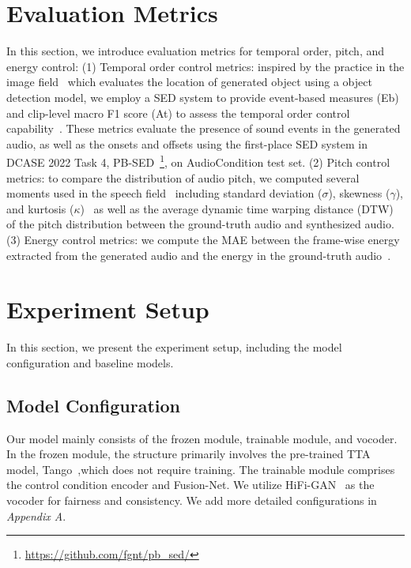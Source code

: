 \documentclass[letterpaper]{article} %
\begin{document}
\section{Evaluation Metrics} 

In this section, we introduce evaluation metrics for temporal order, pitch, and energy control: (1) Temporal order control metrics: inspired by the practice in the image field~\cite{li2023gligen,jahn2021highresolutioncs} which evaluates the location of generated object using a object detection model, we employ a SED system to provide event-based measures (Eb) and clip-level macro F1 score (At) to assess the temporal order control capability~\cite{mesaros2016eventf1}. These metrics evaluate the presence of sound events in the generated audio, as well as the onsets and offsets using the first-place SED system in DCASE 2022 Task 4, PB-SED~\cite{janek2022pssed,janek2020fbsedt,janek2021sased}\footnote{\url{https://github.com/fgnt/pb_sed/}}, on AudioCondition test set. (2) Pitch control metrics: to compare the distribution of audio pitch, we computed several moments used in the speech field~\cite{ren2021fastspeech2} including standard deviation ($\sigma$), skewness ($\gamma$), and kurtosis ($\kappa$)~\cite{bistra2014diffpitch,niebuhr2019measuringas} as well as the average dynamic time warping distance (DTW)~\cite{muller2007dtw} of the pitch distribution between the ground-truth audio and synthesized audio. (3) Energy control metrics: we compute the MAE between the frame-wise energy extracted from the generated audio and the energy in the ground-truth audio~\cite{ren2021fastspeech2}.

\section{Experiment Setup}

In this section, we present the experiment setup, including the model configuration and baseline models. 

\subsection{Model Configuration}

Our model mainly consists of the frozen module, trainable module, and vocoder. In the frozen module, the structure primarily involves the pre-trained TTA model, Tango~\cite{ghosal2023tango},which does not require training. The trainable module comprises the control condition encoder and Fusion-Net. We utilize HiFi-GAN~\cite{kong2020hifigan} as the vocoder for fairness and consistency. We add more detailed configurations in \textit{Appendix A}.
\end{document}

